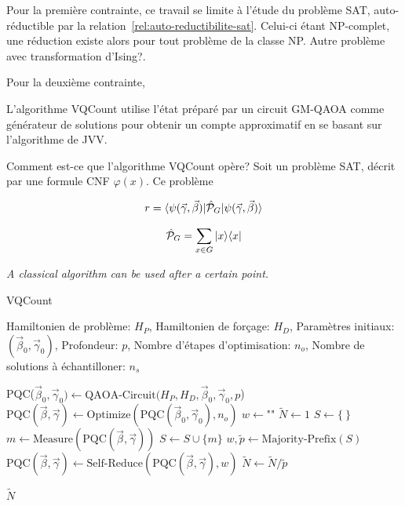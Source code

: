 Pour la première contrainte, ce travail se limite à l'étude du problème SAT, auto-réductible par la relation~\ref{rel:auto-reductibilite-sat}. Celui-ci étant \textsf{NP}-complet, une réduction existe alors pour tout problème de la classe \textsf{NP}. \textsf{Autre problème avec transformation d'Ising?}. 

Pour la deuxième contrainte, 





L'algorithme VQCount utilise l'état préparé par un circuit GM-QAOA comme générateur de solutions pour obtenir un compte approximatif en se basant sur l'algorithme de JVV. 

Comment est-ce que l'algorithme VQCount opère? Soit un problème SAT, décrit par une formule CNF $\varphi(x)$. Ce problème   

\begin{equation}
    r = \braket{ \psi(\vec{\gamma}, \vec{\beta}) | \hat{\mathcal{P}}_{G} | \psi(\vec{\gamma}, \vec{\beta}) }
\end{equation}

\begin{equation}
    \hat{\mathcal{P}}_{G} = \sum_{x \in G} \ket{x}\!\bra{x}
\end{equation}

\textcolor{mydarkred}{\textit{A classical algorithm can be used after a certain point.}}

\begin{algorithm}[hb!]
    \caption{VQCount}\label{alg:vqcount}
    \begin{algorithmic}[1]
    \REQUIRE Hamiltonien de problème: $H_P$, Hamiltonien de forçage: $H_D$, Paramètres initiaux: $(\vec{\beta}_0, \vec{\gamma}_0)$, Profondeur: $p$, Nombre d'étapes d'optimisation: $n_{o}$, Nombre de solutions à échantilloner: $n_s$
    
    \STATE PQC($\vec{\beta}_0, \vec{\gamma}_0) \leftarrow \text{QAOA-Circuit}(H_P, H_D, \vec{\beta}_0, \vec{\gamma}_0, p$)
    \STATE $\text{PQC}(\vec{\beta}, \vec{\gamma}) \leftarrow \text{Optimize}(\text{PQC}(\vec{\beta}_0, \vec{\gamma}_0), n_{o})$
    \STATE $w \leftarrow \texttt{""}$ 
    \STATE $\tilde{N} \leftarrow 1$
    \STATE $S \leftarrow \{ \ \}$
    \STATE $m \leftarrow \text{Measure}(\text{PQC}(\vec{\beta}, \vec{\gamma}))$
    \STATE $S \leftarrow S \cup \{m\}$
    \ENDIF
    \ENDWHILE
    \STATE $w, \tilde{p} \leftarrow \text{Majority-Prefix}(S)$
    \STATE $\text{PQC}(\vec{\beta}, \vec{\gamma}) \leftarrow \text{Self-Reduce}(\text{PQC}(\vec{\beta}, \vec{\gamma}), w)$
    \STATE $\tilde{N} \leftarrow \tilde{N} / \tilde{p}$
    \ENDFOR
    
    \RETURN $\tilde{N}$
\end{algorithmic}
\end{algorithm}
    


